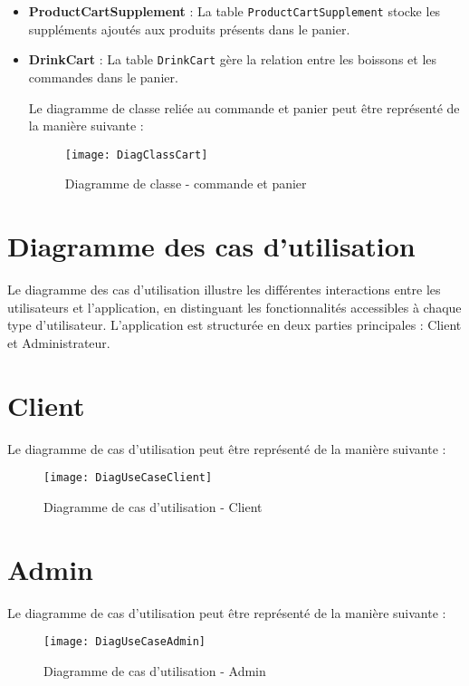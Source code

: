 \begin{itemize}
    \item \textbf{ProductCartSupplement} : La table \texttt{ProductCartSupplement} stocke les suppléments ajoutés aux produits présents dans le panier.

    \item \textbf{DrinkCart} : La table \texttt{DrinkCart} gère la relation entre les boissons et les commandes dans le panier.
    
    Le diagramme de classe reliée au commande et panier peut être représenté de la manière suivante : \\
    \begin{figure}[H]
        \centering
        \texttt{[image: DiagClassCart]}
        \caption{Diagramme de classe - commande et panier}
        \label{fig:class_cart}
    \end{figure}
    
\end{itemize}
\newpage

\section{Diagramme des cas d’utilisation}
Le diagramme des cas d'utilisation illustre les différentes interactions entre les utilisateurs et l'application, en distinguant les fonctionnalités accessibles à chaque type d'utilisateur. L'application est structurée en deux parties principales : Client et Administrateur.

\section*{Client}
Le diagramme de cas d'utilisation peut être représenté de la manière suivante : \\
\begin{figure}[H]
    \centering
    \texttt{[image: DiagUseCaseClient]}
    \caption{Diagramme de cas d’utilisation - Client}
    \label{fig:usecase_client}
\end{figure}

\section*{Admin}
Le diagramme de cas d'utilisation peut être représenté de la manière suivante : \\
\begin{figure}[H]
    \centering
    \texttt{[image: DiagUseCaseAdmin]}
    \caption{Diagramme de cas d’utilisation - Admin}
    \label{fig:usecase_client}
\end{figure}

